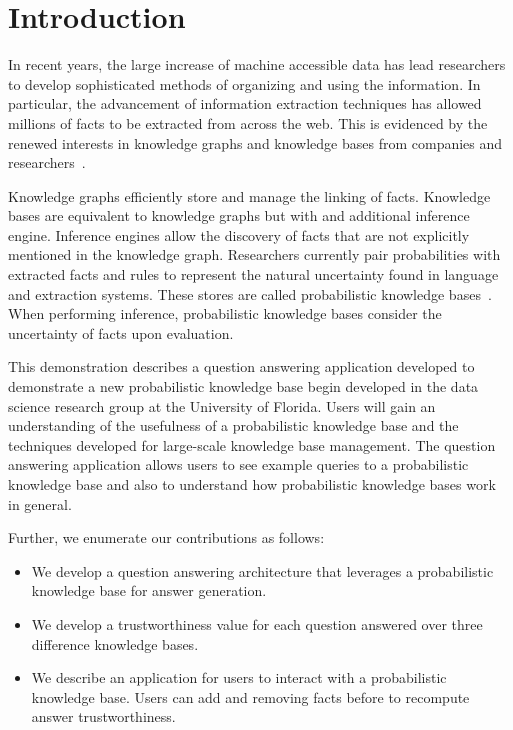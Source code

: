 

\section{Introduction}


In recent years, the large increase of machine accessible data has lead researchers
to develop sophisticated methods of organizing and using the information.
In particular, the advancement of information extraction techniques has allowed
millions of facts to be extracted from across the web.
This is evidenced by the renewed interests in knowledge graphs and knowledge bases
from companies and
researchers~\cite{bellare2013woo,chang2014typed,dong2014knowledge,niu2012deepdive}.

Knowledge graphs efficiently store and manage the linking of facts.
Knowledge bases are equivalent to knowledge graphs but with and additional
inference engine. 
Inference engines allow the discovery of facts that are not explicitly
mentioned in the knowledge graph.
Researchers currently pair probabilities with extracted facts and rules to
represent the natural uncertainty found in language and extraction systems.
These stores are called probabilistic knowledge bases~\cite{chen2014knowledge}.
When performing inference, probabilistic knowledge bases consider the uncertainty
of facts upon evaluation.

This demonstration describes a question answering application developed to demonstrate
a new probabilistic knowledge base begin developed in the data science research group at the University of Florida.
Users will gain an understanding of the usefulness of a probabilistic
knowledge base and the techniques developed for large-scale knowledge base
management.
The question answering application allows users to see example queries to a
probabilistic knowledge base and also to understand how probabilistic knowledge bases work in general.

Further, we enumerate our contributions as follows:
\begin{itemize}
\vspace{-0.5em}
\item We develop a question answering architecture that leverages a probabilistic knowledge base for answer generation.

\vspace{-0.5em}
\item We develop a trustworthiness value for each question answered over three difference knowledge bases.

\vspace{-0.5em}
\item We describe an application for users to interact with a probabilistic knowledge
base. Users can add and removing facts before to recompute answer
trustworthiness.
\end{itemize}

